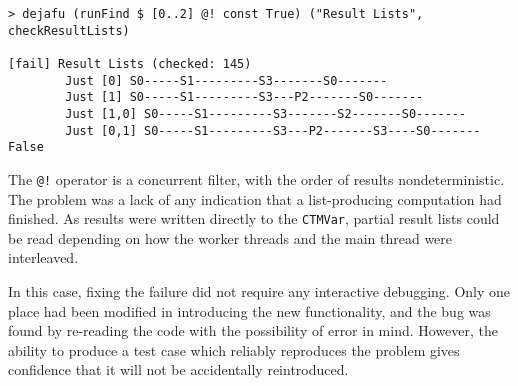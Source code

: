 \begin{verbatim}
> dejafu (runFind $ [0..2] @! const True) ("Result Lists", checkResultLists)

[fail] Result Lists (checked: 145)
        Just [0] S0-----S1---------S3-------S0-------
        Just [1] S0-----S1---------S3---P2-------S0-------
        Just [1,0] S0-----S1---------S3-------S2-------S0-------
        Just [0,1] S0-----S1---------S3---P2-------S3----S0-------
False
\end{verbatim}

The \verb|@!| operator is a concurrent filter, with the order of
results nondeterministic. The problem was a lack of any indication
that a list-producing computation had finished. As results were
written directly to the \verb|CTMVar|, partial result lists could be
read depending on how the worker threads and the main thread were
interleaved.

In this case, fixing the failure did not require any interactive
debugging. Only one place had been modified in introducing the new
functionality, and the bug was found by re-reading the code with the
possibility of error in mind. However, the ability to produce a test
case which reliably reproduces the problem gives confidence that it
will not be accidentally reintroduced.

